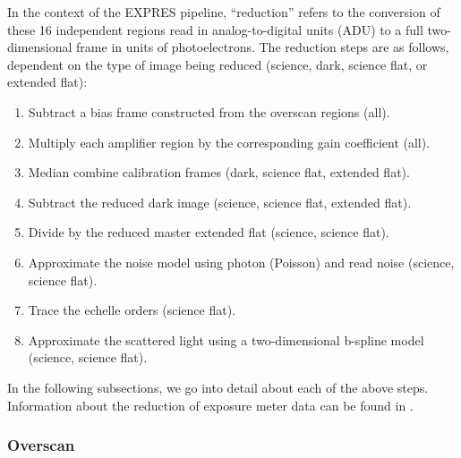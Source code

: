 In the context of the EXPRES pipeline, ``reduction'' refers to the conversion of these 16 independent regions read in analog-to-digital units (ADU) to a full two-dimensional frame in units of photoelectrons. The reduction steps are as follows, dependent on the type of image being reduced (science, dark, science flat, or extended flat):
\begin{enumerate}
    \item Subtract a bias frame constructed from the overscan regions (all).
    \item Multiply each amplifier region by the corresponding gain coefficient (all).
    \item Median combine calibration frames (dark, science flat, extended flat).
    \item Subtract the reduced dark image (science, science flat, extended flat).
    \item Divide by the reduced master extended flat (science, science flat).
    \item Approximate the noise model using photon (Poisson) and read noise (science, science flat).
    \item Trace the echelle orders (science flat).
    \item Approximate the scattered light using a two-dimensional b-spline model (science, science flat).
\end{enumerate}

In the following subsections, we go into detail about each of the above steps. Information about the reduction of exposure meter data can be found in \citet{blackman_measured_2019}.

\subsubsection{Overscan}\label{overscan}

